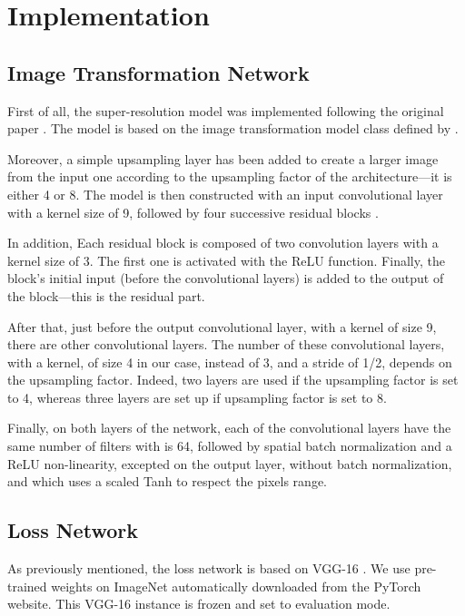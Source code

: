 \documentclass{article}
\begin{document}
{
    \section{Implementation}
    \label{sec:implementation}

    \subsection{Image Transformation Network}
    \label{subsec:image-transformation-network-implementation}

    First of all, the super-resolution model was implemented following the original paper \citep{sr}. The model is based on the image transformation model class defined by \cite{image-transform-network}.

    Moreover, a simple upsampling layer has been added to create a larger image from the input one according to the upsampling factor of the architecture—it is either 4 or 8.
    The model is then constructed with an input convolutional layer with a kernel size of 9, followed by four successive residual blocks \citep{residual}.
  

    In addition, Each residual block is composed of two convolution layers with a kernel size of 3. The first one is activated with the ReLU function. Finally, the block's initial input (before the convolutional layers) is added to the output of the block---this is the residual part.

    After that, just before the output convolutional layer, with a kernel of size 9, there are other convolutional layers. The number of these convolutional layers, with a kernel, of size 4 in our case, instead of 3, and a stride of 1/2, depends on the upsampling factor. Indeed,  two layers are used if the upsampling factor is set to 4, whereas three layers are set up if upsampling factor is set to 8.

    Finally, on both layers of the network, each of the convolutional layers have the same number of filters with is 64, followed by spatial batch normalization and a ReLU non-linearity, excepted on the output layer, without batch normalization, and which uses a scaled Tanh to respect the pixels range.
    \subsection{Loss Network}
    \label{subsec:loss-network-implementation}

    As previously mentioned, the loss network is based on VGG-16 \citep{vgg}. We use pre-trained weights on ImageNet \citep{image-net} automatically downloaded from the PyTorch website. This VGG-16 instance is frozen and set to evaluation mode.

}
\end{document}
